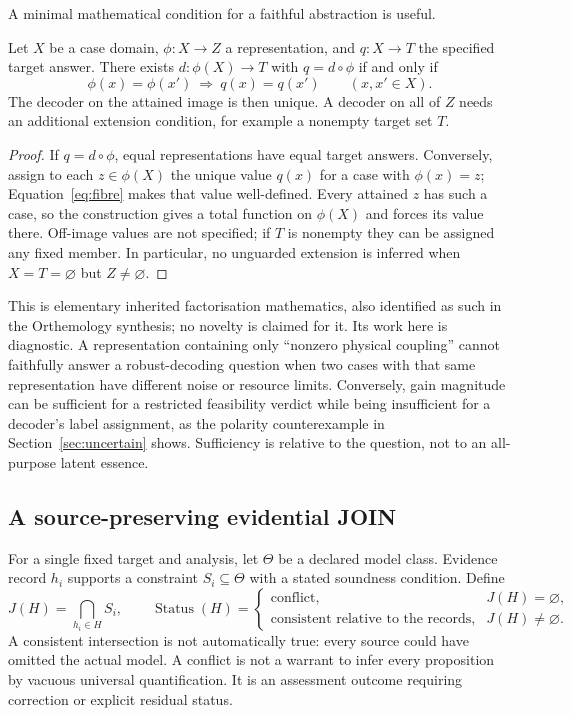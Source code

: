 A minimal mathematical condition for a faithful abstraction is useful.
\begin{proposition}\label{prop:fibre}
Let $X$ be a case domain, $\phi:X\to Z$ a representation, and $q:X\to T$ the specified target answer. There exists $d:\phi(X)\to T$ with $q=d\circ\phi$ if and only if
\begin{equation}\label{eq:fibre}
 \phi(x)=\phi(x')\ \Longrightarrow\ q(x)=q(x')\qquad(x,x'\in X).
\end{equation}
The decoder on the attained image is then unique. A decoder on all of $Z$ needs an additional extension condition, for example a nonempty target set $T$.
\end{proposition}
\begin{proof}
If $q=d\circ\phi$, equal representations have equal target answers. Conversely, assign to each $z\in\phi(X)$ the unique value $q(x)$ for a case with $\phi(x)=z$; Equation~\eqref{eq:fibre} makes that value well-defined. Every attained $z$ has such a case, so the construction gives a total function on $\phi(X)$ and forces its value there. Off-image values are not specified; if $T$ is nonempty they can be assigned any fixed member. In particular, no unguarded extension is inferred when $X=T=\varnothing$ but $Z\ne\varnothing$.
\end{proof}

This is elementary inherited factorisation mathematics, also identified as such in the Orthemology synthesis; no novelty is claimed for it. Its work here is diagnostic. A representation containing only ``nonzero physical coupling'' cannot faithfully answer a robust-decoding question when two cases with that same representation have different noise or resource limits. Conversely, gain magnitude can be sufficient for a restricted feasibility verdict while being insufficient for a decoder's label assignment, as the polarity counterexample in Section~\ref{sec:uncertain} shows. Sufficiency is relative to the question, not to an all-purpose latent essence.

\subsection{A source-preserving evidential JOIN}
For a single fixed target and analysis, let $\Theta$ be a declared model class. Evidence record $h_i$ supports a constraint $S_i\subseteq\Theta$ with a stated soundness condition. Define
\begin{equation}\label{eq:evidencejoin}
 J(H)=\bigcap_{h_i\in H}S_i,\qquad
 \operatorname{Status}(H)=
 \begin{cases}
 \text{conflict},&J(H)=\varnothing,\\
 \text{consistent relative to the records},&J(H)\ne\varnothing.
 \end{cases}
\end{equation}
A consistent intersection is not automatically true: every source could have omitted the actual model. A conflict is not a warrant to infer every proposition by vacuous universal quantification. It is an assessment outcome requiring correction or explicit residual status.

